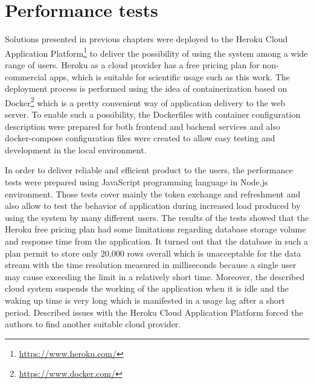 \section{Performance tests}\label{sec:performance-tests}
Solutions presented in previous chapters were deployed to the Heroku Cloud Application Platform\footnote{\url{https://www.heroku.com/}} to deliver the possibility of using the system among a wide range of users.
Heroku as a cloud provider has a free pricing plan for non-commercial apps, which is suitable for scientific usage such as this work.
The deployment process is performed using the idea of containerization based on Docker\footnote{\url{https://www.docker.com/}} which is a pretty convenient way of application delivery to the web server.
To enable such a possibility, the \mbox{Dockerfiles} with container configuration description were prepared for both frontend and backend services and also docker-compose configuration files were created to allow easy testing and development in the local environment.

In order to deliver reliable and efficient product to the users, the performance tests were prepared using JavaScript programming language in Node.js environment.
Those tests cover mainly the token exchange and refreshment and also allow to test the behavior of application during increased load produced by using the system by many different users.
The results of the tests showed that the Heroku free pricing plan had some limitations regarding database storage volume and response time from the application.
It turned out that the database in such a plan permit to store only 20,000 rows overall which is unacceptable for the data stream with the time resolution measured in milliseconds because a single user may cause exceeding the limit in a relatively short time.
Moreover, the described cloud system suspends the working of the application when it is idle and the waking up time is very long which is manifested in a usage lag after a short period.
Described issues with the Heroku Cloud Application Platform forced the authors to find another suitable cloud provider.
